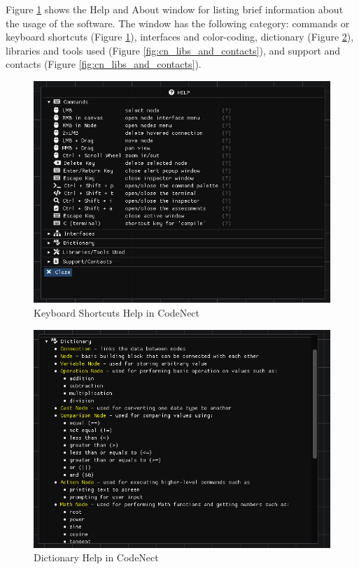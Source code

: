 \parx
Figure \ref{fig:cn_help_and_about} shows the Help and About window for listing
brief information about the usage of the software. The window has the following
category: commands or keyboard shortcuts (Figure \ref{fig:cn_help_and_about}),
interfaces and color-coding, dictionary (Figure \ref{fig:cn_help_dictionary}),
libraries and tools used (Figure \ref{fig:cn_libs_and_contacts}), and support and contacts
(Figure \ref{fig:cn_libs_and_contacts}).

\begin{figure}[H]
	\centering
	\captionsetup{justification=centering}
	\captionsetup[figure]{list=yes}
	\includegraphics[width=\linewidth]{media/sc_help_shortcuts.png}
	\caption[Keyboard Shortcuts Help in CodeNect]{Keyboard Shortcuts Help in CodeNect}
	\label{fig:cn_help_and_about}
\end{figure}

\begin{figure}[H]
	\centering
	\captionsetup{justification=centering}
	\captionsetup[figure]{list=yes}
	\includegraphics[width=\linewidth]{media/sc_help_dictionary.png}
	\caption[Dictionary Help in CodeNect]{Dictionary Help in CodeNect}
	\label{fig:cn_help_dictionary}
\end{figure}

